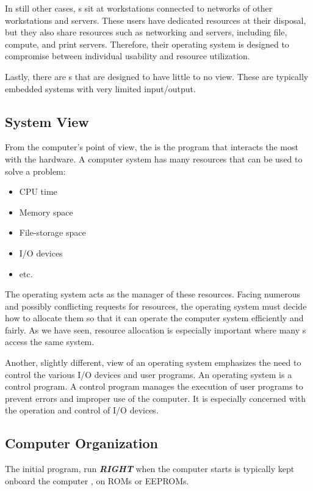 In still other cases, s sit at workstations connected to networks of other workstations and servers.
These users have dedicated resources at their disposal, but they also share resources such as networking and servers, including file, compute, and print servers.
Therefore, their operating system is designed to compromise between individual usability and resource utilization.

Lastly, there are s that are designed to have little to no  view.
These are typically embedded systems with very limited input/output.

\subsection{System View}\label{subsec:System_View}
From the computer’s point of view, the  is the program that interacts the most with the hardware.
A computer system has many resources that can be used to solve a problem:
\begin{itemize}[noitemsep]
\item CPU time
\item Memory space
\item File-storage space
\item I/O devices
\item etc.
\end{itemize}

The operating system acts as the manager of these resources.
Facing numerous and possibly conflicting requests for resources, the operating system must decide how to allocate them so that it can operate the computer system efficiently and fairly.
As we have seen, resource allocation is especially important where many s access the same system.

Another, slightly different, view of an operating system emphasizes the need to control the various I/O devices and user programs.
An operating system is a control program.
A control program manages the execution of user programs to prevent errors and improper use of the computer.
It is especially concerned with the operation and control of I/O devices.

\subsection{Computer Organization}\label{subsec:Computer_Organization}
The initial program, run \textbf{\emph{RIGHT}} when the computer starts is typically kept onboard the computer , on ROMs or EEPROMs.

